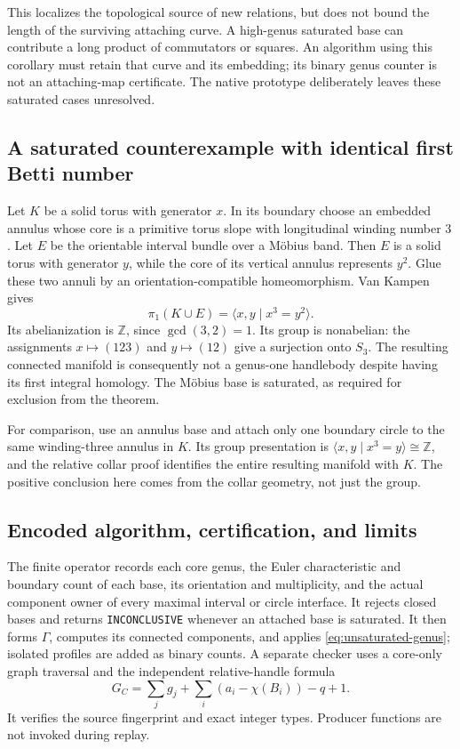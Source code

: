 This localizes the topological source of new relations, but does not
bound the length of the surviving attaching curve.  A high-genus saturated
base can contribute a long product of commutators or squares.  An
algorithm using this corollary must retain that curve and its embedding;
its binary genus counter is not an attaching-map certificate.  The
native prototype deliberately leaves these saturated cases unresolved.

\subsection{A saturated counterexample with identical first Betti number}

Let $K$ be a solid torus with generator $x$.  In its boundary choose an
embedded annulus whose core is a primitive torus slope with longitudinal
winding number $3$.  Let $E$ be the orientable interval bundle over a
M\"obius band.  Then $E$ is a solid torus with generator $y$, while the
core of its vertical annulus represents $y^2$.  Glue these two annuli by
an orientation-compatible homeomorphism.  Van Kampen gives
\[
 \pi_1(K\cup E)=\langle x,y\mid x^3=y^2\rangle.
\]
Its abelianization is $\mathbb Z$, since $\gcd(3,2)=1$.  Its group is
nonabelian: the assignments $x\mapsto(123)$ and $y\mapsto(12)$ give a
surjection onto $S_3$.  The resulting connected manifold is consequently
not a genus-one handlebody despite having its first integral homology.
The M\"obius base is saturated, as required for exclusion from the theorem.

For comparison, use an annulus base and attach only one boundary circle
to the same winding-three annulus in $K$.  Its group presentation is
$\langle x,y\mid x^3=y\rangle\cong\mathbb Z$, and the relative collar
proof identifies the entire resulting manifold with $K$.  The positive
conclusion here comes from the collar geometry, not just the group.

\subsection{Encoded algorithm, certification, and limits}

The finite operator records each core genus, the Euler characteristic and
boundary count of each base, its orientation and multiplicity, and the actual
component owner of every maximal interval or circle interface. It rejects closed
bases and returns \texttt{INCONCLUSIVE} whenever an attached base is
saturated.  It then forms $\Gamma$, computes its connected components,
and applies \eqref{eq:unsaturated-genus}; isolated profiles are added as
binary counts.  A separate checker uses a core-only graph traversal and
the independent relative-handle formula
\[
 G_C=\sum_jg_j+\sum_i(a_i-\chi(B_i))-q+1.
\]
It verifies the source fingerprint and exact integer types.  Producer
functions are not invoked during replay.

